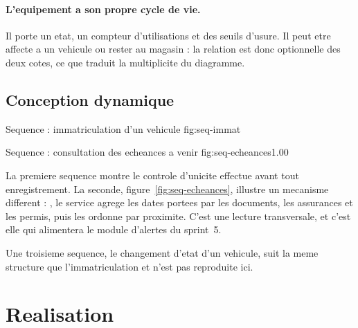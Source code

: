 \paragraph{L'equipement a son propre cycle de vie.}
Il porte un etat, un compteur d'utilisations et des seuils d'usure. Il
peut etre affecte a un vehicule ou rester au magasin : la relation est
donc optionnelle des deux cotes, ce que traduit la multiplicite du
diagramme.

\subsection{Conception dynamique}

%
  {Sequence : immatriculation d'un vehicule}
  {fig:seq-immat}

  {Sequence : consultation des echeances a venir}
  {fig:seq-echeances}{1.00}

La premiere sequence montre le controle d'unicite effectue avant tout
enregistrement. La seconde, figure~\ref{fig:seq-echeances}, illustre un
mecanisme different : , le service
agrege les dates portees par les documents, les assurances et les permis,
puis les ordonne par proximite. C'est une lecture transversale, et c'est
elle qui alimentera le module d'alertes du sprint~5.

Une troisieme sequence, le changement d'etat d'un vehicule, suit la meme
structure que l'immatriculation et n'est pas reproduite ici.

\section{Realisation}

